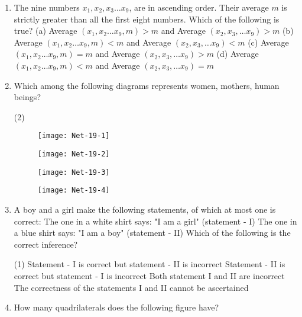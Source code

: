 \begin{enumerate}
\begin{tasks}
	\end{tasks}
\item  The nine numbers $x_{1}, x_{2}, x_{3} \ldots x_{9}$, are in ascending order. Their average $m$ is strictly greater than all the first eight numbers. Which of the following is true?
	(a) Average $\left(x_{1}, x_{2} \ldots x_{9}, m\right)>m$ and Average $\left(x_{2}, x_{3}, \ldots x_{9}\right)>m$
	(b) Average $\left(x_{1}, x_{2} \ldots x_{9}, m\right)<m$ and Average $\left(x_{2}, x_{3}, \ldots x_{9}\right)<m$
	(c) Average $\left(x_{1}, x_{2} \ldots x_{9}, m\right)=m$ and Average $\left(x_{2}, x_{3}, \ldots x_{9}\right)>m$
	(d) Average $\left(x_{1}, x_{2} \ldots x_{9}, m\right)<m$ and Average $\left(x_{2}, x_{3}, \ldots x_{9}\right)=m$
\item  Which among the following diagrams represents women, mothers, human beings?
	 \begin{tasks}(2)
		\task[\textbf{a.}]
		\begin{figure}[H]
			\centering
			\texttt{[image: Net-19-1]}
		\end{figure}
		\task[\textbf{b.}]
		\begin{figure}[H]
			\centering
			\texttt{[image: Net-19-2]}
		\end{figure}
		\task[\textbf{c.}]
		\begin{figure}[H]
			\centering
			\texttt{[image: Net-19-3]}
		\end{figure}
		\task[\textbf{d.}] 
		\begin{figure}[H]
			\centering
			\texttt{[image: Net-19-4]}
		\end{figure}
	\end{tasks}
\item  A boy and a girl make the following statements, of which at most one is correct:
The one in a white shirt says: "I am a girl" (statement - I)
The one in a blue shirt says: "I am a boy" (statement - II)
Which of the following is the correct inference?
	 \begin{tasks}(1)
		\task[\textbf{a.}]Statement - I is correct but statement - II is incorrect
		\task[\textbf{b.}]Statement - II is correct but statement - I is incorrect
		\task[\textbf{c.}]Both statement I and II are incorrect
		\task[\textbf{d.}] The correctness of the statements I and II cannot be ascertained	
	\end{tasks}
\item  How many quadrilaterals does the following figure have?	

\end{enumerate}
